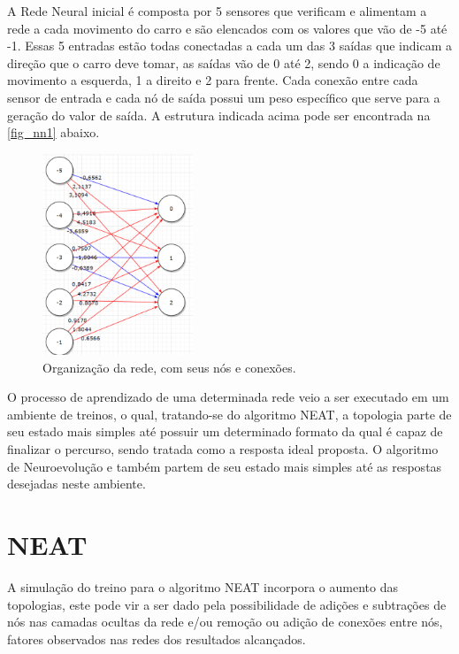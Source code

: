 A Rede Neural inicial é composta por 5 sensores que verificam e alimentam a
rede a cada movimento do carro e são elencados com os valores que vão de -5 até
-1. Essas 5 entradas estão todas conectadas a cada um das 3 saídas que indicam
a direção que o carro deve tomar, as saídas vão de 0 até 2, sendo 0 a indicação
de movimento a esquerda, 1 a direito e 2 para frente. Cada conexão entre cada
sensor de entrada e cada nó de saída possui um peso específico que serve para a
geração do valor de saída. A estrutura indicada acima pode ser encontrada na
\autoref{fig_nn1} abaixo.

\begin{figure}[htb]
        \centering
        \caption{\label{fig_nn1}Organização da rede, com seus nós e conexões.}
        \includegraphics[width=0.4\textwidth]{images/nn1.png}
\end{figure}

O processo de aprendizado de uma determinada rede veio a ser executado em um
ambiente de treinos, o qual, tratando-se do algoritmo NEAT, a topologia parte
de seu estado mais simples até possuir um determinado formato da qual é capaz
de finalizar o percurso, sendo tratada como a resposta ideal proposta. O
algoritmo de Neuroevolução e também partem de seu estado mais
simples até as respostas desejadas neste ambiente.

\section{NEAT}

A simulação do treino para o algoritmo NEAT incorpora o aumento das topologias,
este pode vir a ser dado pela possibilidade de adições e subtrações de nós nas
camadas ocultas da rede e/ou remoção ou adição de conexões entre nós, fatores
observados nas redes dos resultados alcançados.

